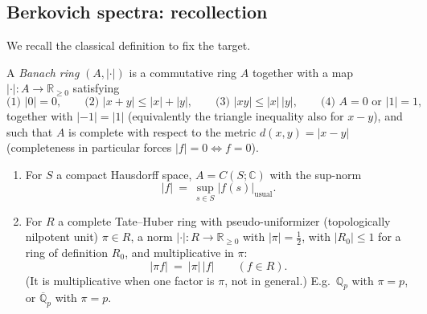 \subsection{Berkovich spectra: recollection}
\label{subsec:22:berkovich-recollection}

We recall the classical definition to fix the target.

\begin{definition}
\label{def:22:banach-ring}
A \emph{Banach ring} $(A,|\cdot|)$ is a commutative ring $A$ together with a map
$|\cdot|\colon A\to\mathbb R_{\ge0}$ satisfying
\begin{equation*}
\text{(1) } |0|=0, \qquad
\text{(2) } |x+y|\le|x|+|y|, \qquad
\text{(3) } |xy|\le|x|\,|y|, \qquad
\text{(4) } A=0 \text{ or } |1|=1,
\end{equation*}
together with $|{-1}|=|1|$ (equivalently the triangle inequality also for
$x-y$), and such that $A$ is complete with respect to the metric
$d(x,y)=|x-y|$ (completeness in particular forces $|f|=0\iff f=0$).
\end{definition}

\begin{example}
\label{ex:22:banach-examples}
\leavevmode
\begin{enumerate}
\item For $S$ a compact Hausdorff space, $A=C(S;\mathbb C)$ with the sup-norm
\begin{equation*}
|f|\ =\ \sup_{s\in S}|f(s)|_{\mathrm{usual}} .
\end{equation*}
\item For $R$ a complete Tate--Huber ring with pseudo-uniformizer (topologically
nilpotent unit) $\pi\in R$, a norm $|\cdot|\colon R\to\mathbb R_{\ge0}$ with
$|\pi|=\tfrac12$, with $|R_0|\le1$ for a ring of definition $R_0$, and
multiplicative in $\pi$:
\begin{equation*}
|\pi f|\ =\ |\pi|\,|f| \qquad(f\in R).
\end{equation*}
(It is multiplicative when one factor is $\pi$, not in general.) E.g.\ $\mathbb
Q_p$ with $\pi=p$, or $\overline{\mathbb Q}_p$ with $\pi=p$.
\end{enumerate}
\end{example}

